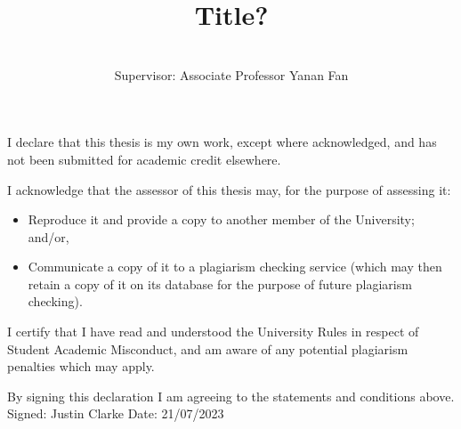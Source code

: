 \documentclass[honours,12pt]{unswthesis}
\title{Title?}
\author{\Authornameonly\\{\bigskip}Supervisor: Associate Professor Yanan Fan}
\newcommand\blankpage{%
    \null
    \thispagestyle{empty}%
    \addtocounter{page}{-1}%
    \newpage}
\numberwithin{equation}{section}
\begin{document}
\beforepreface

\afterpage{\blankpage}



\vskip 10pc \noindent I declare that this thesis is my
own work, except where acknowledged, and has not been submitted for
academic credit elsewhere. 

\vskip 2pc  \noindent I acknowledge that the assessor of this
thesis may, for the purpose of assessing it:
\begin{itemize}
\item Reproduce it and provide a copy to another member of the University; and/or,
\item Communicate a copy of it to a plagiarism checking service (which may then retain a copy of it on its database for the purpose of future plagiarism checking).
\end{itemize}

\vskip 2pc \noindent I certify that I have read and understood the University Rules in
respect of Student Academic Misconduct, and am aware of any potential plagiarism penalties which may 
apply.\vspace{24pt}

\vskip 2pc \noindent By signing 
this declaration I am
agreeing to the statements and conditions above.
\vskip 2pc \noindent
Signed: Justin Clarke \hfill Date: 21/07/2023 \newline
\vskip 1pc

\afterpage{\blankpage}








\end{document}
